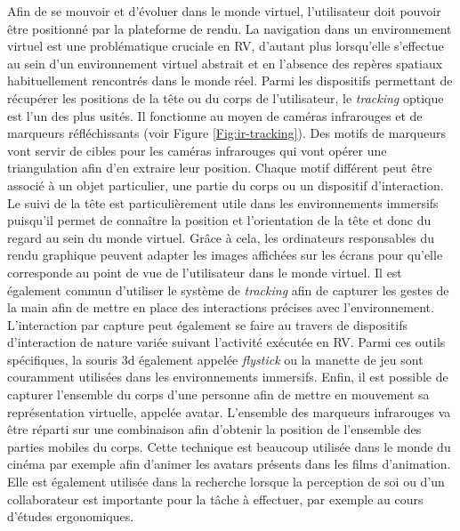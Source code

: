 Afin de se mouvoir et d'évoluer dans le monde virtuel, l'utilisateur doit pouvoir être positionné par la plateforme de rendu. La navigation dans un environnement virtuel est une problématique cruciale en RV, d'autant plus lorsqu'elle s'effectue au sein d'un environnement virtuel abstrait et en l'absence des repères spatiaux habituellement rencontrés dans le monde réel.
Parmi les dispositifs permettant de récupérer les positions de la tête ou du corps de l'utilisateur, le \textit{tracking} optique est l'un des plus usités. Il fonctionne au moyen de caméras infrarouges et de marqueurs réfléchissants (voir Figure \ref{Fig:ir-tracking}). Des motifs de marqueurs vont servir de cibles pour les caméras infrarouges qui vont opérer une triangulation afin d'en extraire leur position. Chaque motif différent peut être associé à un objet particulier, une partie du corps ou un dispositif d'interaction. Le suivi de la tête est particulièrement utile dans les environnements immersifs puisqu'il permet de connaître la position et l’orientation de la tête et donc du regard au sein du monde virtuel. Grâce à cela, les ordinateurs responsables du rendu graphique peuvent adapter les images affichées sur les écrans pour qu'elle corresponde au point de vue de l'utilisateur dans le monde virtuel.
Il est également commun d'utiliser le système de \textit{tracking} afin de capturer les gestes de la main afin de mettre en place des interactions précises avec l'environnement. L'interaction par capture peut également se faire au travers de dispositifs d'interaction de nature variée suivant l'activité exécutée en RV. Parmi ces outils spécifiques, la souris 3d également appelée \textit{flystick} ou la manette de jeu sont couramment utilisées dans les environnements immersifs.
Enfin, il est possible de capturer l'ensemble du corps d'une personne afin de mettre en mouvement sa représentation virtuelle, appelée avatar. L'ensemble des marqueurs infrarouges va être réparti sur une combinaison afin d'obtenir la position de l'ensemble des parties mobiles du corps. Cette technique est beaucoup utilisée dans le monde du cinéma par exemple afin d'animer les avatars présents dans les films d'animation. Elle est également utilisée dans la recherche lorsque la perception de soi ou d'un collaborateur est importante pour la tâche à effectuer, par exemple au cours d'études ergonomiques.

